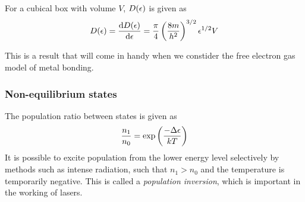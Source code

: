 \begin{thrm}
For a cubical box with volume $V$, $D(\epsilon)$ is given as 
\begin{equation}
  D(\ep)=\diff{D(\ep)}{\ep}=\frac{\pi}{4}\lf(\frac{8m}{h^2} \rt)^{3/2}\ep^{1/2}V
\end{equation}
\end{thrm}
This is a result that will come in handy when we constider the free electron gas model of metal bonding.
\subsubsection{Non-equilibrium states}
The population ratio between states is given as 
\begin{equation}
  \frac{n_1}{n_0}=\exp \left(\frac{-\Delta\epsilon}{kT} \right)
\end{equation}
It is possible to excite population from the lower energy level selectively by methods such as intense radiation, such that $n_1>n_0$ and the temperature is temporarily negative. This is called a \emph{population inversion}, which is important in the working of lasers.
